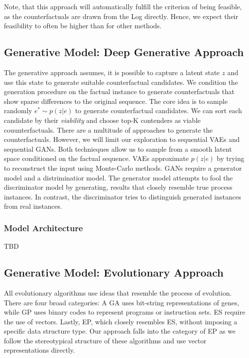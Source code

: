 \documentclass[./../../paper.tex]{subfiles}
\begin{document}
Note, that this approach will automatically fulfill the criterion of being feasible, as the counterfactuals are drawn from the Log directly. Hence, we expect their feasibility to often be higher than for other methods.

\subsection{Generative Model: Deep Generative Approach}
The generative approach assumes, it is possible to capture a latent state $z$ and use this state to generate suitable counterfactual candidates. We condition the generation procedure on the factual instance to generate counterfactuals that show sparse differences to the original sequence. The core idea is to sample randomly $e^* \sim p(z|e)$ to generate counterfactual candidates. We can sort each candidate by their \emph{viability} and choose top-K contenders as viable couunterfactuals. There are a multitude of approaches to generate the counterfactuals. However, we will limit our exploration to sequential \glspl{VAE} and sequential \glspl{GAN}. Both technieques allow us to sample from a smooth latent space conditioned on the factual sequence. \glspl{VAE} approximate $p(z|e)$ by trying to reconstruct the input using Monte-Carlo methods. \glspl{GAN} require a generator model and a distriminatior model. The generator model attempts to fool the discriminator model by generating, results that closely resemble true process instances. In contrast, the discriminator tries to distinguish generated instances from real instances.

\subsubsection{Model Architecture}
TBD


\subsection{Generative Model: Evolutionary Approach}
\label{sec:evolutionary}
All evolutionary algorithms use ideas that resemble the process of evolution. There are four broad categories: A \gls{GA} uses bit-string representations of genes, while \gls{GP} uses binary codes to represent programs or instruction sets. \gls{ES} require the use of vectors. Lastly, \gls{EP}, which closely resembles \gls{ES}, without imposing a specific data structure type. Our approach falls into the category of \gls{EP} as we follow the stereotypical structure of these algorithms and use vector representations directly.
\end{document}
